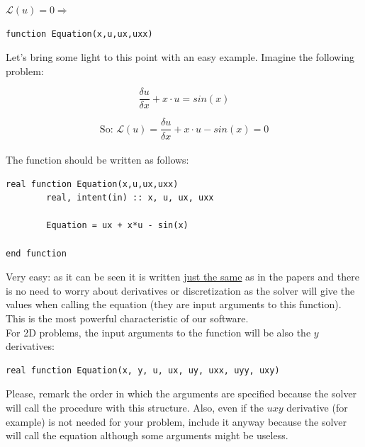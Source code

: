 \begin{blueframed}
\begin{multicols}{2}
\hfill $\mathscr{L}(u)=0  \Longrightarrow$

\columnbreak
\begin{lstlisting} 
function Equation(x,u,ux,uxx)
\end{lstlisting}

\end{multicols}
\end{blueframed}

Let's bring some light to this point with an easy example. Imagine the following
problem:

$$ \frac{\delta u}{\delta x}+ x\cdot u = sin(x)
$$


$$ \text{So: }\mathscr{L}(u)= \frac{\delta u}{\delta x}+ x\cdot u - sin(x)
=0$$\\

The function should be written as follows: 

\begin{blueframed}
\begin{lstlisting} 
real function Equation(x,u,ux,uxx)
		real, intent(in) :: x, u, ux, uxx 
    
		Equation = ux + x*u - sin(x)
		
end function

\end{lstlisting}
\end{blueframed}

Very easy: as it can be seen it is written \underline{just the same} as in the
papers and there is no need to worry about derivatives or discretization as the
solver will give the values when calling the equation (they are input arguments to this
function). This is the most powerful characteristic of our software.\\

For 2D problems, the input arguments to the function will be also the $y$
derivatives: 
\begin{blueframed}
\begin{lstlisting} 
real function Equation(x, y, u, ux, uy, uxx, uyy, uxy) 

\end{lstlisting}
\end{blueframed}

Please, remark the order in which the arguments are specified because the solver
will call the procedure with this structure. Also, even if the $uxy$  derivative (for
example) is not needed for your problem, include it anyway because the
solver will call the equation although some arguments might be useless.\\

